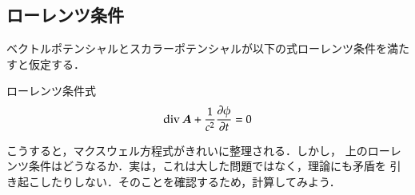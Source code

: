         \subsection{ローレンツ条件}
            ベクトルポテンシャルとスカラーポテンシャルが以下の式ローレンツ条件を満たすと仮定する．
                        \begin{myshadebox}{ローレンツ条件式}
                            \begin{align}
                                \mathrm{div\,}\boldsymbol{A} + \frac{1}{c^{2}}\frac{\partial \phi}{\partial t}
                                =0
                            \end{align}
                        \end{myshadebox}

            こうすると，マクスウェル方程式がきれいに整理される．しかし，
            上のローレンツ条件はどうなるか．実は，これは大した問題ではなく，理論にも矛盾を
            引き起こしたりしない．そのことを確認するため，計算してみよう．

